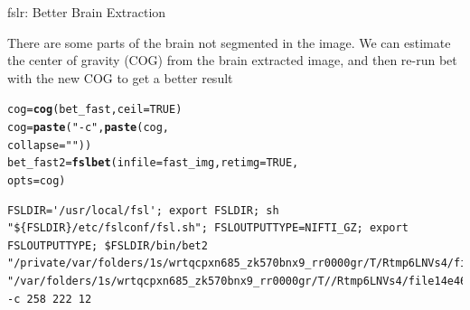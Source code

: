 \documentclass[11pt]{beamer}\usepackage[]{graphicx}\usepackage[]{color}
\makeatletter
\newcommand{\hlnum}[1]{\textcolor[rgb]{0.686,0.059,0.569}{#1}}%
\newcommand{\hlstr}[1]{\textcolor[rgb]{0.192,0.494,0.8}{#1}}%
\newcommand{\hlstd}[1]{\textcolor[rgb]{0.345,0.345,0.345}{#1}}%
\newcommand{\hlkwb}[1]{\textcolor[rgb]{0.69,0.353,0.396}{#1}}%
\newcommand{\hlkwc}[1]{\textcolor[rgb]{0.333,0.667,0.333}{#1}}%
\newcommand{\hlkwd}[1]{\textcolor[rgb]{0.737,0.353,0.396}{\textbf{#1}}}%
\newenvironment{kframe}{%
 \def\at@end@of@kframe{}%
 \ifinner\ifhmode%
  \def\at@end@of@kframe{\end{minipage}}%
  \begin{minipage}{\columnwidth}%
 \fi\fi%
 \def\FrameCommand##1{\hskip\@totalleftmargin \hskip-\fboxsep
 \colorbox{shadecolor}{##1}\hskip-\fboxsep
     \hskip-\linewidth \hskip-\@totalleftmargin \hskip\columnwidth}%
 \MakeFramed {\advance\hsize-\width
   \@totalleftmargin\z@ \linewidth\hsize
   \@setminipage}}%
 {\par\unskip\endMakeFramed%
 \at@end@of@kframe}
\newenvironment{knitrout}{}{} %
\makeatother
\begin{document}
\begin{frame}[fragile]{fslr: Better Brain Extraction}

There are some parts of the brain not segmented in the image.  We can estimate the center of gravity (COG) from the brain extracted image, and then re-run bet with the new COG to get a better result

\begin{knitrout}
\color{fgcolor}\begin{kframe}
\begin{alltt}
\hlstd{cog} \hlkwb{=} \hlkwd{cog}\hlstd{(bet_fast,} \hlkwc{ceil}\hlstd{=}\hlnum{TRUE}\hlstd{)}
\hlstd{cog} \hlkwb{=} \hlkwd{paste}\hlstd{(}\hlstr{"-c"}\hlstd{,} \hlkwd{paste}\hlstd{(cog,}
                        \hlkwc{collapse}\hlstd{=} \hlstr{" "}\hlstd{))}
\hlstd{bet_fast2} \hlkwb{=} \hlkwd{fslbet}\hlstd{(}\hlkwc{infile}\hlstd{=fast_img,} \hlkwc{retimg}\hlstd{=}\hlnum{TRUE}\hlstd{,}
                   \hlkwc{opts} \hlstd{= cog)}
\end{alltt}
\begin{verbatim}
FSLDIR='/usr/local/fsl'; export FSLDIR; sh "${FSLDIR}/etc/fslconf/fsl.sh"; FSLOUTPUTTYPE=NIFTI_GZ; export FSLOUTPUTTYPE; $FSLDIR/bin/bet2 "/private/var/folders/1s/wrtqcpxn685_zk570bnx9_rr0000gr/T/Rtmp6LNVs4/file14e4639409ef9.nii.gz" "/var/folders/1s/wrtqcpxn685_zk570bnx9_rr0000gr/T//Rtmp6LNVs4/file14e46342e04da" -c 258 222 12 
\end{verbatim}
\end{kframe}
\end{knitrout}
\end{frame}
\end{document}

